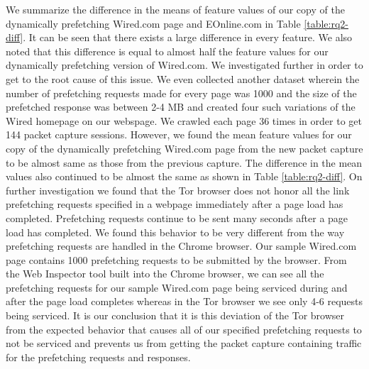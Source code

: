 We summarize the difference in the means of feature values of our copy of the dynamically prefetching Wired.com page and EOnline.com\cite{eonline} in Table \ref{table:rq2-diff}. It can be seen that there exists a large difference in every feature. 
We also noted that this difference is equal to almost half the feature values for our dynamically prefetching version of Wired.com\cite{tj-wired}. 
We investigated further in order to get to the root cause of this issue. 
We even collected another dataset wherein the number of prefetching requests made for every page was 1000 and the size of the prefetched response was between 2-4 MB and created four such variations of the Wired homepage on our webspage\cite{tj-wired}. 
We crawled each page 36 times in order to get 144 packet capture sessions.
However, we found the mean feature values for our copy of the dynamically prefetching Wired.com page from the new packet capture to be almost same as those from the previous capture. 
The difference in the mean values also continued to be almost the same as shown in Table \ref{table:rq2-diff}.
On further investigation we found that the Tor browser does not honor all the link prefetching requests specified in a webpage immediately after a page load has completed. 
Prefetching requests continue to be sent many seconds after a page load has completed. 
We found this behavior to be very different from the way prefetching requests are handled in the Chrome browser\cite{chrome}. 
Our sample Wired.com page\cite{tj-wired} contains 1000 prefetching requests to be submitted by the browser.
From the Web Inspector tool built into the Chrome browser, we can see all the prefetching requests for our sample Wired.com page being serviced during and after the page load completes whereas in the Tor browser we see only 4-6 requests being serviced.
It is our conclusion that it is this deviation of the Tor browser from the expected behavior that causes all of our specified prefetching requests to not be serviced and prevents us from getting the packet capture containing traffic for the prefetching requests and responses.  



